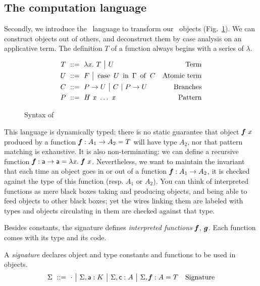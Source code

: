 \documentclass{llncs}
\begin{document}
\subsection{The computation language}
\label{sec:comput}

Secondly, we introduce the \CL\ language to transform our \SLF\
objects (Fig.~\ref{fig:syntax-CL}). We can construct objects out of
others, and deconstruct them by case analysis on an applicative
term. The definition $T$ of a function always begins with a series of
$\lambda$.

\begin{figure}
  \centering
  \begin{align*}
    T &\ ::=\  \lambda{\ensuremath{\text{\textit{x}}}}.\  T \ {\big|}\ 
    U & \text{Term} \\
    U &\ ::=\  F \ {\big|}\ 
    \operatorname{case}\ {{U}\ \operatorname{in}\ {\Gamma}}\ \operatorname{of}\  C & \text{Atomic term}\\
    C &\ ::=\  {P}\to U \ {\big|}\ 
    C\ |\ {P}\to U & \text{Branches}\\
    P &\ ::=\  {H}\  {\text{\textit{x}}}\ \ldots\ {\text{\textit{x}}} &\text{Pattern} \\
  \end{align*}
  
  \caption{Syntax of \CL}
\label{fig:syntax-CL}
\end{figure}

This language is dynamically typed: there is no static guarantee that
object ${\text{\textit{\textbf{f}}}}\  x$ produced by a function $\text{\textit{\textbf{f}}} : A_1\to A_2 =
T$ will have type $A_2$, nor that pattern matching is exhaustive. It
is also non-terminating: we can define a recursive function $\text{\textit{\textbf{f}}} :
\text{\textsf{a}}\to \text{\textsf{a}} = \lambda{\ensuremath{\text{\textit{x}}}}.\  {\text{\textit{\textbf{f}}}}\  {\text{\textit{x}}}$. Nevertheless, we
want to maintain the invariant that each time an object goes in or out
of a function $\text{\textit{\textbf{f}}} : A_1\to A_2$, it is checked against the type of
this function (resp. $A_1$ or $A_2$). You can think of interpreted
functions as mere black boxes taking and producing objects, and being
able to feed objects to other black boxes; yet the wires linking them
are labeled with types and objects circulating in them are checked
against that type.

Besides constants, the signature defines \emph{interpreted functions}
$\text{\textit{\textbf{f}}}$, $\text{\textit{\textbf{g}}}$. Each function comes with its type and its
code. 

\begin{definition}
  A \emph{signature} declares object and type constants and functions
  to be used in objects.
  \begin{align*}
    \Sigma &\ ::=\ 
    \cdot
    \ {\big|}\ 
    {\Sigma},{\text{\textsf{a}} : K}
    \ {\big|}\ 
    {\Sigma},{\text{\textsf{c}} : A}
    \ {\big|}\ 
    {\Sigma},{\text{\textit{\textbf{f}}} : A = T}
    &\text{Signature}
  \end{align*}
\end{definition}
\end{document}
